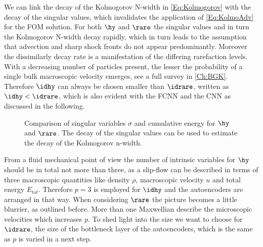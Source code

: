 We can link the decay of the Kolmogorov N-width in \cref{Eq:Kolmogorov} with the decay of the singular values, which invalidates the application of \cref{Eq:KolmoAdv} for the FOM solution. For both \(\hy\) and \(\rare\) the singular values and in turn the Kolmogorov N-width decay rapidly, which in turn leads to the assumption that advection and sharp shock fronts do not appear predominantly. Moreover the dissimilarly decay rate is a manifestation of the differing rarefaction levels. With a decreasing number of particles present, the lesser the probability of a single bulk macroscopic velocity emerges, see a full survey in \cref{Ch:BGK}. Therefore \(\idhy\) can always be chosen smaller than \(\idrare\), written as \(\idhy < \idrare\), which is also evident with the FCNN and the CNN as discussed in the following.   
\begin{figure}[H]
	\begin{subfigure}{.45\textwidth}
		
		\label{Fig:CumSum_Rare}
	\end{subfigure}\hfill
	\begin{subfigure}{.45\textwidth}
		
		\label{Fig:CumSum_Hydro}
	\end{subfigure}
	\caption{Comparison of singular variables \(\sigma\) and cumulative energy for \(\hy\) and \(\rare\). The decay of the singular values can be used to estimate the decay of the Kolmogorov n-width.}
	\label{Fig:CUSUM-e}
\end{figure}
From a fluid mechanical point of view the number of intrinsic variables for \(\hy\) should be in total not more than three, as a slip-flow can be described in terms of three macroscopic quantities like density \(\rho\), macroscopic velocity \(u\) and total energy \(E_{tot}\)\cite{BGK}\cite{Bernard}. Therefore \(p=3\) is employed for \(\idhy\) and the autoencoders are arranged in that way. When considering \(\rare\) the picture becomes a little blurrier, as outlined before. More than one Maxwellian describe the microscopic velocities which increases \(p\). To shed light into the size we want to choose for \(\idrare\), the size of the bottleneck layer of the autoencoders, which is the same as \(p\) is varied in a next step.\\

